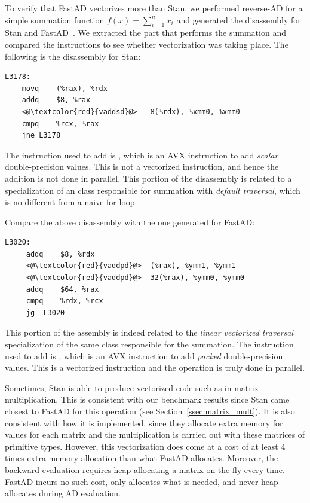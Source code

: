 To verify that FastAD vectorizes more than Stan, 
we performed reverse-AD for a simple summation function $f(x) = \sum\limits_{i=1}^n x_i$
and generated the disassembly for Stan and FastAD~\footnotemark.\@
{}
We extracted the part that performs the summation
and compared the instructions to see whether vectorization was taking place.\@
The following is the disassembly for Stan:
\begin{lstlisting}[style=customasm]
L3178:
    movq    (%rax), %rdx
    addq    $8, %rax
    <@\textcolor{red}{vaddsd}@>   8(%rdx), %xmm0, %xmm0 
    cmpq    %rcx, %rax 
    jne L3178
\end{lstlisting}
The instruction used to add is ,
which is an AVX instruction to add \emph{scalar} double-precision values.
This is not a vectorized instruction, and hence the addition is not done in parallel.
This portion of the disassembly is related to a specialization of an  class 
responsible for summation with \emph{default traversal},
which is no different from a naive for-loop.

Compare the above disassembly with the one generated for FastAD:
\begin{lstlisting}[style=customasm]
 L3020:
     addq    $8, %rdx
     <@\textcolor{red}{vaddpd}@>  (%rax), %ymm1, %ymm1   
     <@\textcolor{red}{vaddpd}@>  32(%rax), %ymm0, %ymm0 
     addq    $64, %rax
     cmpq    %rdx, %rcx 
     jg  L3020 
\end{lstlisting}
This portion of the assembly is indeed related to the \emph{linear vectorized traversal}
specialization of the same  class responsible for the summation.
The instruction used to add is ,
which is an AVX instruction to add \emph{packed} double-precision values.
This is a vectorized instruction and the operation is truly done in parallel.

Sometimes, Stan is able to produce vectorized code such as in matrix multiplication.
This is consistent with our benchmark results 
since Stan came closest to FastAD for this operation (see Section~\ref{ssec:matrix_mult}).
It is also consistent with how it is implemented,
since they allocate extra memory for  values for each matrix 
and the multiplication is carried out with these matrices of primitive types.
However, this vectorization does come at a cost of at least 4 times extra memory allocation than what FastAD allocates.
Moreover, the backward-evaluation requires heap-allocating a matrix on-the-fly every time.
FastAD incurs no such cost, only allocates what is needed, and never heap-allocates during AD evaluation.
